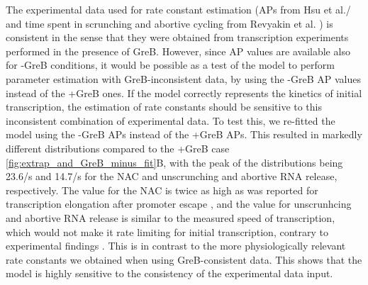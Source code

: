 The experimental data used for rate constant estimation (APs from Hsu et al./
\cite{hsu_initial_2006} and time spent in scrunching and abortive cycling from
Revyakin et al. \cite{revyakin_abortive_2006}) is consistent in the sense that
they were obtained from transcription experiments performed in the presence of
GreB. However, since AP values are available also for -GreB conditions, it
would be possible as a test of the model to perform parameter estimation with
GreB-inconsistent data, by using the -GreB AP values instead of the +GreB
ones. If the model correctly represents the kinetics of initial transcription,
the estimation of rate constants should be sensitive to this inconsistent
combination of experimental data. To test this, we re-fitted the model using
the -GreB APs instead of the +GreB APs. This resulted in markedly different
distributions compared to the +GreB case \ref{fig:extrap_and_GreB_minus_fit}B,
with the peak of the distributions being 23.6/s and 14.7/s for
the NAC and unscrunching and abortive RNA release, respectively. The value for
the NAC is twice as high as was reported for transcription elongation after
promoter escape \cite{revyakin_abortive_2006}, and the value for unscrunhcing
and abortive RNA release is similar to the measured speed of transcription,
which would not make it rate limiting for initial transcription, contrary to
experimental findings \cite{revyakin_abortive_2006, margeat_direct_2006}. This
is in contrast to the more physiologically relevant rate constants we obtained
when using GreB-consistent data. This shows that the model is highly sensitive
to the consistency of the experimental data input.
